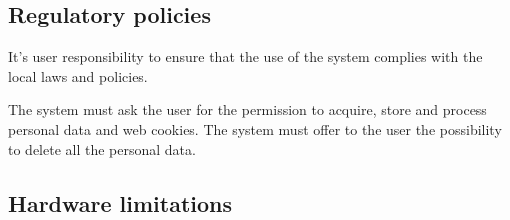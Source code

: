 \subsection{Regulatory policies}
It's user responsibility to ensure that the use of the system complies with the local laws and policies.

The system must ask the user for the permission to acquire, store and process personal data and web cookies. The system must offer to the user the possibility to delete all the personal data.

\subsection{Hardware limitations}

